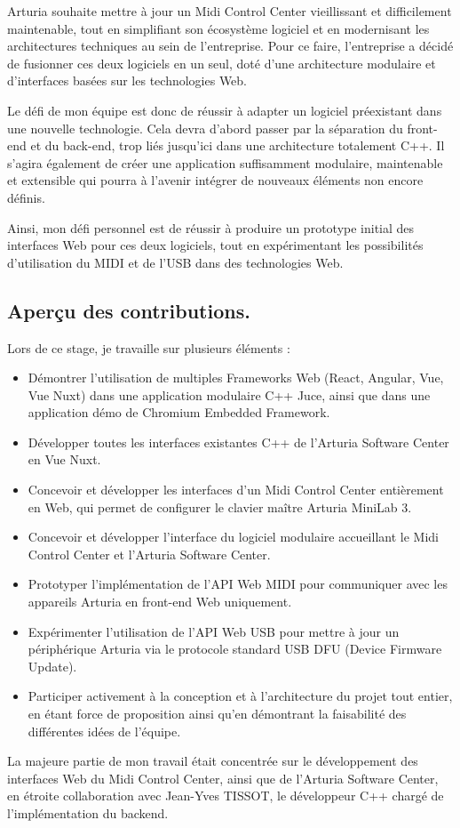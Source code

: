 \documentclass[francais]{rapportPFE}  %
\begin{document}
Arturia souhaite mettre à jour un Midi Control Center vieillissant et difficilement maintenable, tout en simplifiant son écosystème logiciel et en modernisant les architectures techniques au sein de l'entreprise. Pour ce faire, l'entreprise a décidé de fusionner ces deux logiciels en un seul, doté d'une architecture modulaire et d'interfaces basées sur les technologies Web. 

Le défi de mon équipe est donc de réussir à adapter un logiciel préexistant dans une nouvelle technologie. Cela devra d'abord passer par la séparation du front-end et du back-end, trop liés jusqu'ici dans une architecture totalement C++. Il s'agira également de créer une application suffisamment modulaire, maintenable et extensible qui pourra à l'avenir intégrer de nouveaux éléments non encore définis.

Ainsi, mon défi personnel est de réussir à produire un prototype initial des interfaces Web pour ces deux logiciels, tout en expérimentant les possibilités d'utilisation du MIDI et de l'USB dans des technologies Web.



\subsection{Aperçu des contributions.}
Lors de ce stage, je travaille sur plusieurs éléments : 
\begin{itemize}
    \setlength\itemsep{0em}
    \item Démontrer l'utilisation de multiples Frameworks Web (React, Angular, Vue, Vue Nuxt) dans une application modulaire C++ Juce, ainsi que dans une application démo de Chromium Embedded Framework.
    \item Développer toutes les interfaces existantes C++ de l'Arturia Software Center en Vue Nuxt.
    \item Concevoir et développer les interfaces d'un Midi Control Center entièrement en Web, qui permet de configurer le clavier maître Arturia MiniLab 3.
    \item Concevoir et développer l'interface du logiciel modulaire accueillant le Midi Control Center et l'Arturia Software Center.
    \item Prototyper l'implémentation de l'API Web MIDI pour communiquer avec les appareils Arturia en front-end Web uniquement.
    \item Expérimenter l'utilisation de l'API Web USB pour mettre à jour un périphérique Arturia via le protocole standard USB DFU (Device Firmware Update).
    \item Participer activement à la conception et à l'architecture du projet tout entier, en étant force de proposition ainsi qu'en démontrant la faisabilité des différentes idées de l'équipe.
\end{itemize}
La majeure partie de mon travail était concentrée sur le développement des interfaces Web du Midi Control Center, ainsi que de l'Arturia Software Center, en étroite collaboration avec Jean-Yves TISSOT, le développeur C++ chargé de l'implémentation du backend. 
\end{document}

